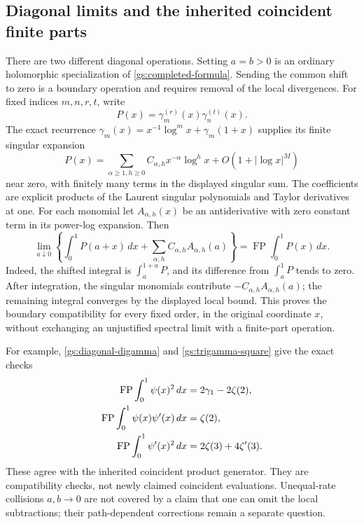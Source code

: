 \documentclass[11pt,letterpaper]{article}
\numberwithin{equation}{section}
\theoremstyle{definition}
\theoremstyle{remark}
\begin{document}
\subsection{Diagonal limits and the inherited coincident finite parts}

There are two different diagonal operations.  Setting $a=b>0$
is an ordinary holomorphic specialization of
\eqref{gs:completed-formula}.  Sending the common shift to zero is
a boundary operation and requires removal of the local divergences.
For fixed indices $m,n,r,t$, write
\[
 P(x)=\gamma_m^{(r)}(x)\gamma_n^{(t)}(x).
\]
The exact recurrence
$\gamma_m(x)=x^{-1}\log^m x+\gamma_m(1+x)$ supplies its finite
singular expansion
\[
 P(x)=\sum_{\alpha\ge1,h\ge0}C_{\alpha,h}x^{-\alpha}\log^h x
           +O(1+|\log x|^M)
\]
near zero, with finitely many terms in the displayed singular sum.
The coefficients are explicit products of the Laurent singular
polynomials and Taylor derivatives at one.  For each monomial let
$A_{\alpha,h}(x)$ be an antiderivative with zero constant term in
its power-log expansion.  Then
\begin{equation}\label{gs:boundary-limit}
 \lim_{a\downarrow0}\left\{
 \int_0^1P(a+x)\,dx
       +\sum_{\alpha,h}C_{\alpha,h}A_{\alpha,h}(a)\right\}
 =\operatorname{FP}\int_0^1P(x)\,dx.
\end{equation}
Indeed, the shifted integral is $\int_a^{1+a}P$, and its difference
from $\int_a^1P$ tends to zero.  After integration, the singular
monomials contribute $-C_{\alpha,h}A_{\alpha,h}(a)$; the remaining
integral converges by the displayed local bound.  This proves the
boundary compatibility for every fixed order, in the original
coordinate $x$, without exchanging an unjustified spectral limit
with a finite-part operation.

For example, \eqref{gs:diagonal-digamma} and
\eqref{gs:trigamma-square} give the exact checks
\begin{align}
 \operatorname{FP}\int_0^1\psi(x)^2\,dx
     &=2\gamma_1-2\zeta(2),\notag\\
 \operatorname{FP}\int_0^1\psi(x)\psi'(x)\,dx
     &=\zeta(2),\notag\\
 \operatorname{FP}\int_0^1\psi'(x)^2\,dx
     &=2\zeta(3)+4\zeta'(3).
 \label{gs:boundary-checks}
\end{align}
These agree with the inherited coincident product generator.  They
are compatibility checks, not newly claimed coincident evaluations.
Unequal-rate collisions $a,b\to0$ are not covered by a claim that
one can omit the local subtractions; their path-dependent corrections
remain a separate question.
\end{document}
